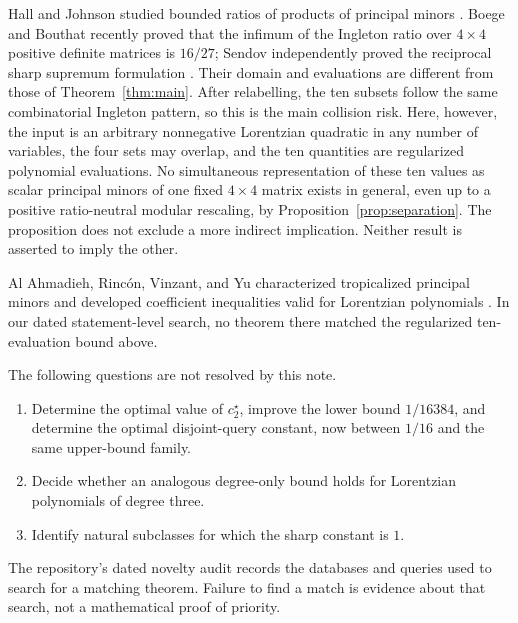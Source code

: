 \documentclass[11pt]{article}
\theoremstyle{remark}
\begin{document}
Hall and Johnson studied bounded ratios of products of principal minors
\cite{HallJohnson2008}.  Boege and Bouthat recently proved that the infimum of
the Ingleton ratio over $4\times4$ positive definite matrices is $16/27$;
Sendov independently proved the reciprocal sharp supremum formulation
\cite{BoegeBouthat2026,Sendov2026}.  Their domain and evaluations are different from
those of Theorem~\ref{thm:main}.  After relabelling, the ten subsets follow
the same combinatorial Ingleton pattern, so this is the main collision risk.
Here, however, the input is an arbitrary nonnegative Lorentzian quadratic in
any number of variables, the four sets may overlap, and the ten quantities are
regularized polynomial evaluations.  No simultaneous representation of
these ten values as scalar principal minors of one fixed $4\times4$ matrix
exists in general, even up to a positive ratio-neutral modular rescaling, by
Proposition~\ref{prop:separation}.  The proposition does not exclude a more
indirect implication.  Neither result is asserted to imply the other.

Al Ahmadieh, Rinc\'on, Vinzant, and Yu characterized tropicalized principal
minors and developed coefficient inequalities valid for Lorentzian
polynomials \cite{AlAhmadiehRinconVinzantYu2025}.  In our dated statement-level
search, no theorem there matched the regularized ten-evaluation bound above.

The following questions are not resolved by this note.
\begin{enumerate}
\item Determine the optimal value of $c_2^\star$, improve the lower bound
$1/16384$, and determine the optimal disjoint-query constant, now between
$1/16$ and the same upper-bound family.
\item Decide whether an analogous degree-only bound holds for Lorentzian
polynomials of degree three.
\item Identify natural subclasses for which the sharp constant is $1$.
\end{enumerate}

The repository's dated novelty audit records the databases and queries used
to search for a matching theorem.  Failure to find a match is evidence about
that search, not a mathematical proof of priority.
\end{document}
